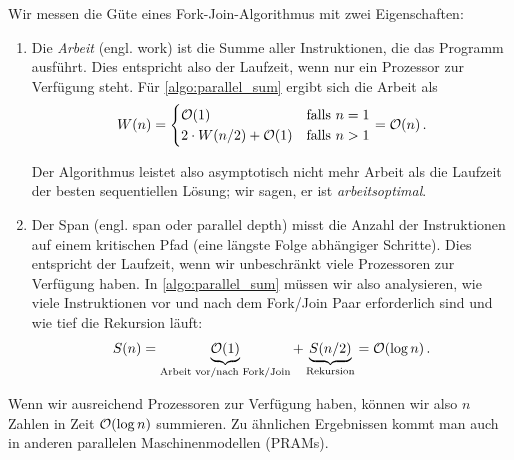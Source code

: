 Wir messen die Güte eines Fork-Join-Algorithmus mit zwei Eigenschaften:
\begin{enumerate}
    \item
          Die  \emph{Arbeit} (engl. work) ist die Summe aller Instruktionen, die das Programm ausführt.
          Dies entspricht also der Laufzeit, wenn nur ein Prozessor zur Verfügung steht.
          Für \cref{algo:parallel_sum} ergibt sich die Arbeit als
          \begin{equation}
              W(n) = \begin{cases}
                  \mathcal{O}\!\left(1\right)                  & \text{falls } n = 1 \\
                  2 \cdot W(n/2) + \mathcal{O}\!\left(1\right) & \text{falls } n > 1
              \end{cases}
              = \mathcal{O}\!\left(n\right).
          \end{equation}

          Der  Algorithmus leistet also asymptotisch nicht mehr Arbeit als die Laufzeit der besten sequentiellen Lösung; wir sagen, er ist \emph{arbeitsoptimal}.

    \item
          Der  Span (engl. span oder parallel depth) misst die Anzahl der Instruktionen auf einem kritischen Pfad (\dh eine längste Folge abhängiger Schritte).
          Dies entspricht der Laufzeit, wenn wir unbeschränkt viele Prozessoren zur Verfügung haben.
          In \cref{algo:parallel_sum} müssen wir also analysieren, wie viele Instruktionen vor und nach dem Fork/Join Paar erforderlich sind und wie tief die Rekursion läuft:
          \begin{equation}
              S(n) = \underbrace{\mathcal{O}\!\left(1\right)}_\text{Arbeit vor/nach Fork/Join} + \underbrace{S(n/2)}_\text{Rekursion} = \mathcal{O}\!\left(\log n\right).
          \end{equation}
\end{enumerate}

Wenn wir ausreichend Prozessoren zur Verfügung haben, können wir also $n$ Zahlen in Zeit $\mathcal{O}\!\left(\log n\right)$ summieren.
Zu ähnlichen Ergebnissen kommt man auch in anderen parallelen Maschinenmodellen (\zB PRAMs).

